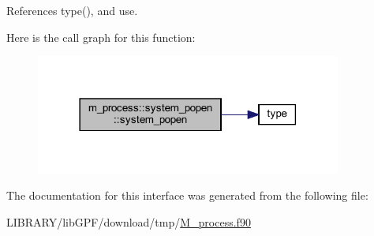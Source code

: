 References type(), and use.

Here is the call graph for this function\+:
\nopagebreak
\begin{figure}[H]
\begin{center}
\leavevmode
\includegraphics[width=285pt]{interfacem__process_1_1system__popen_a45211cf49fdd755983b08ed6f3705bb1_cgraph}
\end{center}
\end{figure}


The documentation for this interface was generated from the following file\+:\begin{DoxyCompactItemize}
\item 
L\+I\+B\+R\+A\+R\+Y/lib\+G\+P\+F/download/tmp/\hyperlink{M__process_8f90}{M\+\_\+process.\+f90}\end{DoxyCompactItemize}
